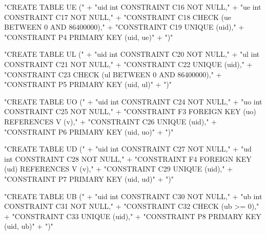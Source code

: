 \documentclass{article}
\def\nwendcode{\endtrivlist \endgroup}      %
\let\nwdocspar=\par
\theoremstyle{definition}                   %
\begin{document}
"CREATE TABLE UE ("
  + "uid int  CONSTRAINT C16 NOT NULL,"
  + "ue  int  CONSTRAINT C17 NOT NULL,"
  + "CONSTRAINT C18 CHECK (ue BETWEEN 0 AND 86400000),"
  + "CONSTRAINT C19 UNIQUE (uid),"
  + "CONSTRAINT P4 PRIMARY KEY (uid, ue)"
  + ")"
\nwendcode{}\nwdocspar
\nwenddocs{}\endmoddef{}
"CREATE TABLE UL ("
  + "uid int  CONSTRAINT C20 NOT NULL,"
  + "ul  int  CONSTRAINT C21 NOT NULL,"
  + "CONSTRAINT C22 UNIQUE (uid),"
  + "CONSTRAINT C23 CHECK (ul BETWEEN 0 AND 86400000),"
  + "CONSTRAINT P5 PRIMARY KEY (uid, ul)"
  + ")"
\nwendcode{}\nwdocspar
\nwenddocs{}\endmoddef{}
"CREATE TABLE UO ("
  + "uid int  CONSTRAINT C24 NOT NULL,"
  + "uo  int  CONSTRAINT C25 NOT NULL,"
  + "CONSTRAINT F3 FOREIGN KEY (uo) REFERENCES V (v),"
  + "CONSTRAINT C26 UNIQUE (uid),"
  + "CONSTRAINT P6 PRIMARY KEY (uid, uo)"
  + ")"
\nwendcode{}\nwdocspar
\nwenddocs{}\endmoddef{}
"CREATE TABLE UD ("
  + "uid int  CONSTRAINT C27 NOT NULL,"
  + "ud  int  CONSTRAINT C28 NOT NULL,"
  + "CONSTRAINT F4 FOREIGN KEY (ud) REFERENCES V (v),"
  + "CONSTRAINT C29 UNIQUE (uid),"
  + "CONSTRAINT P7 PRIMARY KEY (uid, ud)"
  + ")"
\nwendcode{}\nwdocspar
\nwenddocs{}\endmoddef{}
"CREATE TABLE UB ("
  + "uid int  CONSTRAINT C30 NOT NULL,"
  + "ub  int  CONSTRAINT C31 NOT NULL,"
  + "CONSTRAINT C32 CHECK (ub >= 0),"
  + "CONSTRAINT C33 UNIQUE (uid),"
  + "CONSTRAINT P8 PRIMARY KEY (uid, ub)"
  + ")"
\nwendcode{}\nwdocspar
\end{document}
